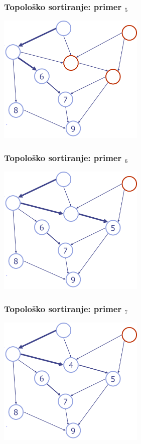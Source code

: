 \documentclass[compress,aspectratio=169]{beamer}
\begin{document}
\begin{frame}[fragile]
  \frametitle{Topološko sortiranje: primer $_5$}
  \begin{center}
    \includegraphics[width=7cm]{asp-14-pic52.png}
  \end{center}
\end{frame}

\begin{frame}[fragile]
  \frametitle{Topološko sortiranje: primer $_6$}
  \begin{center}
    \includegraphics[width=7cm]{asp-14-pic53.png}
  \end{center}
\end{frame}

\begin{frame}[fragile]
  \frametitle{Topološko sortiranje: primer $_7$}
  \begin{center}
    \includegraphics[width=7cm]{asp-14-pic54.png}
  \end{center}
\end{frame}
\end{document}
